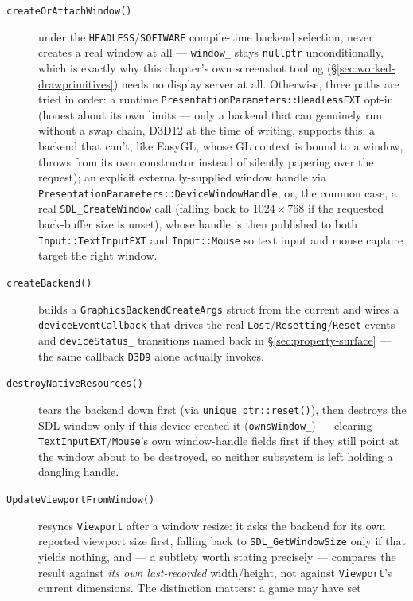 \begin{description}
\item[\texttt{createOrAttachWindow()}] under the \texttt{HEADLESS}/\texttt{SOFTWARE}
  compile-time backend selection, never creates a real window at all --- \texttt{window\_}
  stays \texttt{nullptr} unconditionally, which is exactly why this chapter's own screenshot
  tooling (\S\ref{sec:worked-drawprimitives}) needs no display server at all. Otherwise, three
  paths are tried in order: a runtime \texttt{PresentationParameters::HeadlessEXT} opt-in
  (honest about its own limits --- only a backend that can genuinely run without a swap chain,
  D3D12 at the time of writing, supports this; a backend that can't, like EasyGL, whose GL
  context is bound to a window, throws from its own constructor instead of silently
  papering over the request); an explicit externally-supplied window handle via
  \texttt{PresentationParameters::DeviceWindowHandle}; or, the common case, a real
  \texttt{SDL\_CreateWindow} call (falling back to $1024\times768$ if the requested back-buffer
  size is unset), whose handle is then published to both \texttt{Input::TextInputEXT} and
  \texttt{Input::Mouse} so text input and mouse capture target the right window.
\item[\texttt{createBackend()}] builds a \texttt{GraphicsBackendCreateArgs} struct from the
  current  and wires a \texttt{deviceEventCallback} that
  drives the real \texttt{Lost}/\texttt{Resetting}/\texttt{Reset} events and
  \texttt{deviceStatus\_} transitions named back in \S\ref{sec:property-surface} --- the same
  callback \texttt{D3D9} alone actually invokes.
\item[\texttt{destroyNativeResources()}] tears the backend down first (via
  \texttt{unique\_ptr::reset()}), then destroys the SDL window only if this device created it
  (\texttt{ownsWindow\_}) --- clearing \texttt{TextInputEXT}/\texttt{Mouse}'s own window-handle
  fields first if they still point at the window about to be destroyed, so neither subsystem is
  left holding a dangling handle.
\item[\texttt{UpdateViewportFromWindow()}] resyncs \texttt{Viewport} after a window resize:
  it asks the backend for its own reported viewport size first, falling back to
  \texttt{SDL\_GetWindowSize} only if that yields nothing, and --- a subtlety worth stating
  precisely --- compares the result against \emph{its own last-recorded} width/height, not
  against \texttt{Viewport}'s current dimensions. The distinction matters: a game may have set

\end{description}
